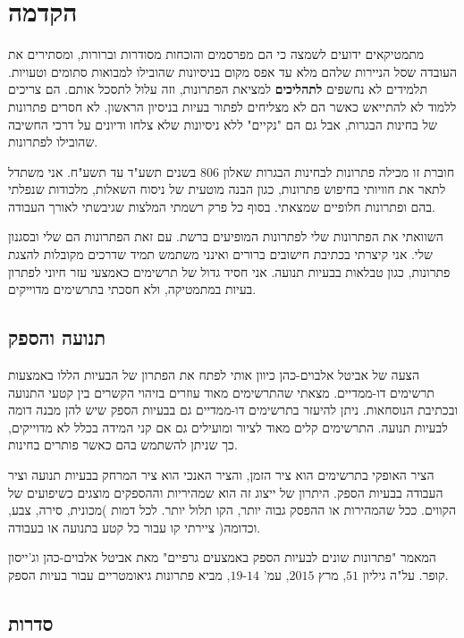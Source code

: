 \section*{הקדמה}

מתמטיקאים ידועים לשמצה כי הם מפרסמים והוכחות מסודרות וברורות, ומסתירים את העובדה שסל הניירות שלהם מלא עד אפס מקום בניסיונות שהובילו למבואות סתומים וטעויות. תלמידים לא נחשפים
\textbf{לתהליכים}
למציאת הפתרונות, וזה עלול לתסכל אותם. הם צריכים ללמוד לא להתייאש כאשר הם לא מצליחים לפתור בעיות בניסיון הראשון. לא חסרים פתרונות של בחינות הבגרות, אבל גם הם "נקיים" ללא ניסיונות שלא צלחו ודיונים על דרכי החשיבה שהובילו לפתרונות.

חוברת זו מכילה פתרונות לבחינות הבגרות שאלון
$806$
בשנים תשע"ד עד תשע"ח. אני משתדל לתאר את חוויותי בחיפוש פתרונות, כגון הבנה מוטעית של ניסוח השאלות, מלכודות שנפלתי בהם ופתרונות חלופיים שמצאתי. בסוף כל פרק רשמתי המלצות שגיבשתי לאורך העבודה.

השוואתי את הפתרונות שלי לפתרונות המופיעים ברשת. עם זאת הפתרונות הם שלי ובסגנון שלי. אני קיצרתי בכתיבת חישובים ברורים ואינני משתמש תמיד שדרכים מקובלות להצגת פתרונות, כגון טבלאות בבעיות תנועה. אני חסיד גדול של תרשימים כאמצעי עזר חיוני לפתרון בעיות במתמטיקה, ולא חסכתי בתרשימים מדוייקים.

\subsection*{תנועה והספק}

הצעה של אביטל אלבוים-כהן כיוון אותי לפתח את הפתרון של הבעיות הללו באמצעות תרשימים דו-ממדיים. מצאתי שהתרשימים מאוד עוזרים בזיהוי הקשרים בין קטעי התנועה ובכתיבת הנוסחאות. ניתן להיעזר בתרשימים דו-ממדיים גם בבעיות הספק שיש להן מבנה דומה לבעיות תנועה. התרשימים קלים מאוד לציור ומועילים גם אם קני המידה בכלל לא מדוייקים, כך שניתן להשתמש בהם כאשר פותרים בחינות.


הציר האופקי בתרשימים הוא ציר הזמן, והציר האנכי הוא ציר המרחק בבעיות תנועה וציר העבודה בבעיות הספק. היתרון של ייצוג זה הוא שמהיריות וההספקים מוצגים כשיפועים של הקווים. ככל שהמהירות או ההפסק גבוה יותר, הקו תלול יותר. לכל דמות )מכונית, סירה, צבע, וכדומה( ציירתי קו עבור כל קטע בתנועה או בעבודה.

המאמר "פתרונות שונים לבעיות הספק באמצעים גרפיים" מאת אביטל אלבוים-כהן וג'ייסון קופר. על"ה גיליון
$51$,
מרץ
$2015$,
עמ'
$14$-$19$,
מביא פתרונות גיאומטריים עבור בעיות הספק.

\subsection*{סדרות}

